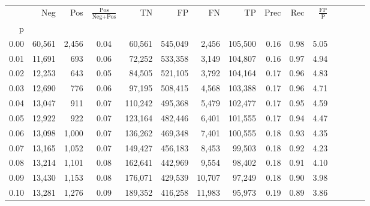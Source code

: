 \begin{tabular}{rrrcrrrrrrrrrrr}
\toprule
{} &     Neg &     Pos & $\frac{\text{Pos}}{\text{Neg}+\text{Pos}}$ &       TN &       FP &       FN &       TP &  Prec &   Rec & $\frac{\text{FP}}{\text{P}}$ \\
p    &         &         &                                            &          &          &          &          &       &       &                              \\
\midrule
0.00 &  60,561 &   2,456 &                                       0.04 &   60,561 &  545,049 &    2,456 &  105,500 &  0.16 &  0.98 &                         5.05 \\
0.01 &  11,691 &     693 &                                       0.06 &   72,252 &  533,358 &    3,149 &  104,807 &  0.16 &  0.97 &                         4.94 \\
0.02 &  12,253 &     643 &                                       0.05 &   84,505 &  521,105 &    3,792 &  104,164 &  0.17 &  0.96 &                         4.83 \\
0.03 &  12,690 &     776 &                                       0.06 &   97,195 &  508,415 &    4,568 &  103,388 &  0.17 &  0.96 &                         4.71 \\
0.04 &  13,047 &     911 &                                       0.07 &  110,242 &  495,368 &    5,479 &  102,477 &  0.17 &  0.95 &                         4.59 \\
0.05 &  12,922 &     922 &                                       0.07 &  123,164 &  482,446 &    6,401 &  101,555 &  0.17 &  0.94 &                         4.47 \\
0.06 &  13,098 &   1,000 &                                       0.07 &  136,262 &  469,348 &    7,401 &  100,555 &  0.18 &  0.93 &                         4.35 \\
0.07 &  13,165 &   1,052 &                                       0.07 &  149,427 &  456,183 &    8,453 &   99,503 &  0.18 &  0.92 &                         4.23 \\
0.08 &  13,214 &   1,101 &                                       0.08 &  162,641 &  442,969 &    9,554 &   98,402 &  0.18 &  0.91 &                         4.10 \\
0.09 &  13,430 &   1,153 &                                       0.08 &  176,071 &  429,539 &   10,707 &   97,249 &  0.18 &  0.90 &                         3.98 \\
0.10 &  13,281 &   1,276 &                                       0.09 &  189,352 &  416,258 &   11,983 &   95,973 &  0.19 &  0.89 &                         3.86 \\

\end{tabular}
